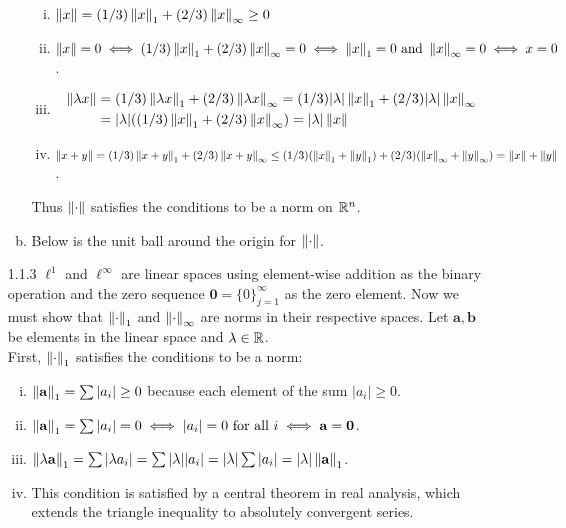 \documentclass[../../Solutions.tex]{subfiles}
\begin{document}
\begin{itemize}
\begin{enumerate}[(a)]
				\begin{enumerate}[(i)]
					\item $\left\lVert x\right\rVert = (1/3)\left\lVert x\right\rVert_1+(2/3)\left\lVert x\right\rVert_\infty \geq 0$
					\item $\left\lVert x\right\rVert = 0 \iff (1/3)\left\lVert x\right\rVert_1+(2/3)\left\lVert x\right\rVert_\infty = 0 \iff \left\lVert x\right\rVert_1 = 0 \text{ and } \left\lVert x\right\rVert_\infty = 0 \iff x = 0$.
					\item \begin{equation*} \begin{split}
						 \left\lVert\lambda x\right\rVert & = (1/3)\left\lVert\lambda x\right\rVert_1+(2/3)\left\lVert\lambda x\right\rVert_\infty = (1/3)|\lambda|\left\lVert x\right\rVert_1+(2/3)|\lambda|\left\lVert x\right\rVert_\infty \\
							 & = |\lambda|((1/3)\left\lVert x\right\rVert_1+(2/3)\left\lVert x\right\rVert_\infty) = |\lambda|\left\lVert x\right\rVert
					\end{split} \end{equation*}
					\item $\left\lVert x+y\right\rVert = (1/3)\left\lVert x+y\right\rVert_1+(2/3)\left\lVert x+y\right\rVert_\infty \leq (1/3)(\left\lVert x\right\rVert_1+\left\lVert y\right\rVert_1)+(2/3)(\left\lVert x\right\rVert_\infty+\left\lVert y\right\rVert_\infty) = \left\lVert x\right\rVert+\left\lVert y\right\rVert$.
				\end{enumerate}
				Thus $\left\lVert\cdot\right\rVert$ satisfies the conditions to be a norm on $\mathbb{R}^n$.
			\item Below is the unit ball around the origin for $\left\lVert\cdot\right\rVert$.
			\begin{figure}[h]
				\begin{center}
					
				\end{center}
			\end{figure}
		\end{enumerate}
	
	\item [1.1.3] $\ell^1$ and $\ell^\infty$ are linear spaces using element-wise addition as the binary operation and the zero sequence $\mathbf{0} = \{0\}_{j=1}^\infty$ as the zero element.
	Now we must show that $\left\lVert\cdot\right\rVert_1$ and $\left\lVert\cdot\right\rVert_\infty$ are norms in their respective spaces.
	Let $\mathbf{a},\mathbf{b}$ be elements in the linear space and $\lambda \in \mathbb{R}$. \\
	First, $\left\lVert\cdot\right\rVert_1$ satisfies the conditions to be a norm:
	\begin{enumerate}[(i)]
		\item $\left\lVert\mathbf{a}\right\rVert_1 = \sum | a_i | \geq 0$ because each element of the sum $|a_i| \geq 0$.
		\item $\left\lVert\mathbf{a}\right\rVert_1 = \sum | a_i | = 0 \iff |a_i| = 0 \text{ for all } i \iff \mathbf{a} = \mathbf{0}$.
		\item $\left\lVert\lambda\mathbf{a}\right\rVert_1 = \sum | \lambda a_i | = \sum |\lambda||a_i| = |\lambda|\sum |a_i| = |\lambda|\left\lVert\mathbf{a}\right\rVert_1$.
		\item This condition is satisfied by a central theorem in real analysis, which extends the triangle inequality to absolutely convergent series.
	\end{enumerate}
	

\end{itemize}
\end{document}
